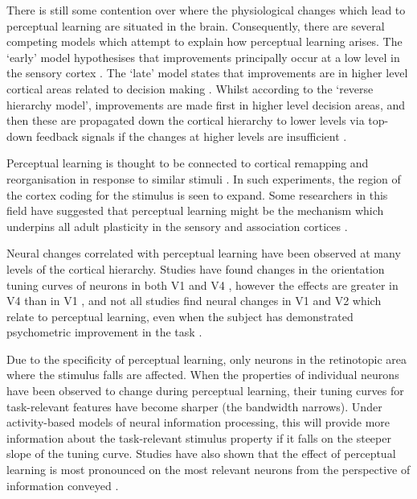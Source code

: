 There is still some contention over where the physiological changes which lead to perceptual learning are situated in the brain. Consequently, there are several competing models which attempt to explain how perceptual learning arises.
The `early' model hypothesises that improvements principally occur at a low level in the sensory cortex \cite{Gilbert2001,Fahle2005}.
The `late' model states that improvements are in higher level cortical areas related to decision making \cite{Yu2004}.
Whilst according to the `reverse hierarchy model', improvements are made first in higher level decision areas, and then these are propagated down the cortical hierarchy to lower levels via top-down feedback signals if the changes at higher levels are insufficient \cite{Ahissar2004,Hochstein2002}.

Perceptual learning is thought to be connected to cortical remapping and reorganisation in response to similar stimuli \cite{Dinse2003,Pleger2003,Polley2006}. In such experiments, the region of the cortex coding for the stimulus is seen to expand.
Some researchers in this field have suggested that perceptual learning might be the mechanism which underpins all adult plasticity in the sensory and association cortices \cite{Gilbert2001}.


Neural changes correlated with perceptual learning have been observed at many levels of the cortical hierarchy. Studies have found changes in the orientation tuning curves of neurons in both V1 \cite{Schoups2001} and V4 \cite{Yang2004,Raiguel2006}, however the effects are greater in V4 than in V1 \cite{Raiguel2006}, and not all studies find neural changes in V1 and V2 which relate to perceptual learning, even when the subject has demonstrated psychometric improvement in the task \cite{Ghose2002}.

Due to the specificity of perceptual learning, only neurons in the retinotopic area where the stimulus falls are affected. 
When the properties of individual neurons have been observed to change during perceptual learning, their tuning curves for task-relevant features have become sharper (\ie the bandwidth narrows). Under activity-based models of neural information processing, this will provide more information about the task-relevant stimulus property if it falls on the steeper slope of the tuning curve. Studies have also shown that the effect of perceptual learning is most pronounced on the most relevant neurons from the perspective of information conveyed \cite{Raiguel2006}. 


